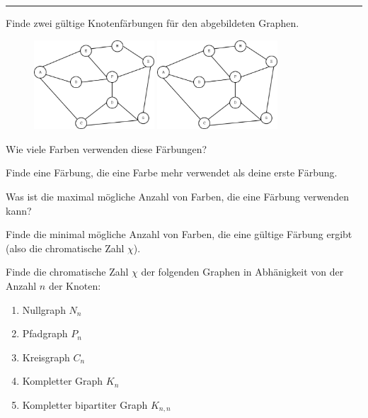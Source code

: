 

\usepackage{pstricks,pst-node,pst-tree}
\usepackage{graphicx}




  \sheet[%
  number=2,
      topic={F\"arbung von Graphen},
    ]

\vspace{-1cm}
\noindent\rule{12cm}{0.4pt}

  \exercise[%
  topic = Knotenf\"arbung 
    ]

%



 \subexercise[%
  topic=Einen Graphen f\"arben,
    ]

Finde zwei g\"ultige Knotenf\"arbungen f\"ur den abgebildeten Graphen.

\begin{figure}[h]
\includegraphics[width=0.4\textwidth]{graph_colouring.eps}
\includegraphics[width=0.4\textwidth]{graph_colouring.eps}
\end{figure}

Wie viele Farben verwenden diese F\"arbungen?

Finde eine F\"arbung, die eine Farbe mehr verwendet als deine erste F\"arbung.

Was ist die maximal m\"ogliche Anzahl von Farben, die eine F\"arbung verwenden kann?

Finde die minimal m\"ogliche Anzahl von Farben, die eine g\"ultige F\"arbung
ergibt (also die chromatische Zahl $\chi$).

\subexercise[%
  topic=Chromatische Zahl bestimmter Graphen,
    ]
		\label{subseq:graphen}
Finde die chromatische Zahl $\chi$ der folgenden Graphen in Abh\"anigkeit von der Anzahl $n$ der Knoten:
\begin{enumerate}
\item Nullgraph $N_n$
\item Pfadgraph $P_n$
\item Kreisgraph $C_n$
\item Kompletter Graph $K_n$
\item Kompletter bipartiter Graph $K_{n,n}$
\end{enumerate}


